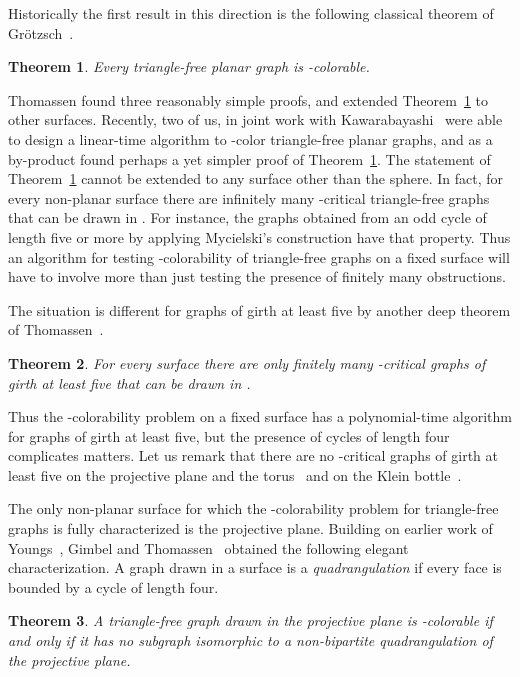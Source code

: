 \documentclass{article}
\def\mylabel#1{{\label{#1}}}
\newtheorem{theorem}{Theorem}
\begin{document}
Historically the first result in this direction is the following
classical theorem of Gr\"otzsch~\cite{grotzsch}.

\begin{theorem}
\label{grotzsch}
Every triangle-free planar graph is -colorable.
\end{theorem}

Thomassen \cite{thom-torus,Tho3list,ThoShortlist}
found three reasonably simple proofs, and extended Theorem~\ref{grotzsch}
to other surfaces.  
Recently, two of us, in joint work with Kawarabayashi~\cite{DvoKawTho}
were able to design a linear-time algorithm to -color triangle-free
planar graphs, and as a by-product found perhaps a yet simpler proof
of Theorem~\ref{grotzsch}.
The statement of Theorem~\ref{grotzsch}
cannot be extended to any surface other than the sphere.
In fact, for every non-planar surface  there are infinitely many
-critical triangle-free graphs that can be drawn in .
For instance, the graphs obtained from an odd cycle of length five or more
by applying Mycielski's
construction \cite[Section~8.5]{BonMur} have that property.
Thus an algorithm for testing -colorability of triangle-free graphs
on a fixed surface will have to involve more than just testing the
presence of finitely many obstructions.

The situation is different for graphs of girth at least five
by another deep theorem of Thomassen~\cite{thom-surf}.

\begin{theorem}
\mylabel{thm:thomgirth5}
For every surface  there are only finitely many -critical
graphs of girth at least five that can be drawn in .
\end{theorem}

Thus the -colorability problem on a fixed surface
has a polynomial-time algorithm
for graphs of girth at least five, but the presence of cycles of
length four complicates matters.
Let us remark that there are no -critical graphs of girth at least five
on the projective plane and the torus~\cite{thom-torus} and
on the Klein bottle~\cite{thomwalls}.

The only non-planar surface for which the -colorability problem
for triangle-free graphs is fully characterized is the projective plane.
Building on earlier work of Youngs~\cite{Youngs}, Gimbel and
Thomassen~\cite{gimbel} obtained the following elegant characterization.
A graph drawn in a surface is a {\em quadrangulation} if every face
is bounded by a cycle of length four.

\begin{theorem}
\mylabel{thm:gimtho}
A triangle-free graph drawn in the projective plane is -colorable if and only
if it has no subgraph isomorphic to a non-bipartite
quadrangulation of the projective plane.
\end{theorem}
\end{document}
